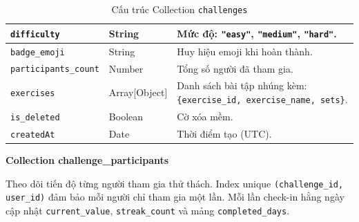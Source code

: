 \begin{table}[H]
\begin{tabularx}{\textwidth}{|p{3.6cm}|p{2.6cm}|X|}
\rowcolor{dbrowalt}
\texttt{difficulty}        & String        & Mức độ: \texttt{"easy"}, \texttt{"medium"}, \texttt{"hard"}. \\ \hline
\texttt{badge\_emoji}       & String        & Huy hiệu emoji khi hoàn thành. \\ \hline
\rowcolor{dbrowalt}
\texttt{participants\_count} & Number       & Tổng số người đã tham gia. \\ \hline
\texttt{exercises}         & Array[Object] & Danh sách bài tập nhúng kèm: \texttt{\{exercise\_id, exercise\_name, sets\}}. \\ \hline
\rowcolor{dbrowalt}
\texttt{is\_deleted}        & Boolean       & Cờ xóa mềm. \\ \hline
\texttt{createdAt}         & Date          & Thời điểm tạo (UTC). \\ \hline
\end{tabularx}
\caption{Cấu trúc Collection \texttt{challenges}}
\label{tab:col_challenges}
\end{table}

\textbf{Collection challenge\_participants}
\label{subsec:col_challenge_participants}

Theo dõi tiến độ từng người tham gia thử thách. Index unique \texttt{(challenge\_id, user\_id)} đảm bảo mỗi người chỉ tham gia một lần. Mỗi lần check-in hằng ngày cập nhật \texttt{current\_value}, \texttt{streak\_count} và mảng \texttt{completed\_days}.

